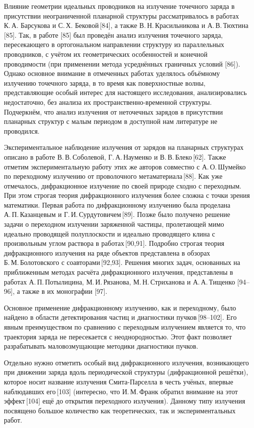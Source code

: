 Влияние геометрии идеальных проводников на излучение точечного заряда в присутствии неограниченной планарной структуры рассматривалось в работах К. А. Барсукова и С. Х. Бековой [84], а также В. Н. Красильникова и А. В. Тюхтина [85]. Так, в работе [85] был проведён анализ излучения точечного заряда, пересекающего в ортогональном направлении структуру из параллельных проводников, с учётом их геометрических особенностей и конечной проводимости (при применении метода усреднённых граничных условий [86]). Однако основное внимание в отмеченных работах уделялось объёмному излучению точечного заряда, в то время как поверхностные волны, представляющие особый интерес для настоящего исследования, анализировались недостаточно, без анализа их пространственно-временной структуры. Подчеркнём, что анализ излучения от неточечных зарядов в присутствии планарных структур с малым периодом в доступной нам литературе не проводился.  

Экспериментальное наблюдение излучения от зарядов на планарных структурах описано в работе В. В. Соболевой, Г. А. Науменко и В. В. Блеко [62]. Также отметим экспериментальную работу этих же авторов совместно с А. О. Шумейко по переходному излучению от проволочного метаматериала [88]. 
Как уже отмечалось, дифракционное излучение по своей природе сходно с переходным. При этом строгая теория дифракционного излучения более сложна с точки зрения математики. Первая работа по дифракционному излучению была проделана А. П. Казанцевым и Г. И. Сурдутовичем [89]. Позже было получено решение задачи о переходном излучении заряженной частицы, пролетающей мимо идеально проводящей полуплоскости и идеально проводящего клина с произвольным углом раствора в работах [90,91]. Подробно строгая теория дифракционного излучения на ряде объектов представлена в обзорах Б. М. Болотовского с соавторами [92,93]. Решения многих задач, основанных на приближенным методах расчёта дифракционного излучения, представлены в работах А. П. Потылицина, М. И. Рязанова, М. Н. Стриханова и А. А. Тищенко [94–96], а также в их монографии [97].  

Основное применение дифракционному излучению, как и переходному, было найдено в области детектирования частиц и диагностики пучков [98–102]. Его явным преимуществом по сравнению с переходным излучением является то, что траектория заряда не пересекается с неоднородностью. Этот факт позволяет разрабатывать маловозмущающие методики диагностики пучков.  

Отдельно нужно отметить особый вид дифракционного излучения, возникающего при движении заряда вдоль периодической структуры (дифракционной решётки), которое носит название излучения Смита-Парселла в честь учёных, впервые наблюдавших его [103] (интересно, что И. М. Франк обратил внимание на этот эффект [104] ещё до открытия переходного излучения). Данному типу излучения посвящено большое количество как теоретических, так и экспериментальных работ.  

